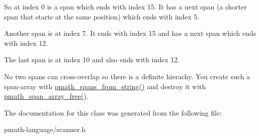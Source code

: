 So at index 0 is a span which ends with index 15. It has a next span (a shorter span that starts at the same position) which ends with index 5. \par
 Another span is at index 7. It ends with index 15 and has a next span which ends with index 12. \par
 The last span is at index 10 and also ends with index 12.

No two spans can cross-overlap so there is a definite hierachy. You create such a span-array with \hyperlink{group__parser_g877ac507e27c8791a265105f796f3cef}{pmath\_\-spans\_\-from\_\-string()} and destroy it with \hyperlink{group__parser_gceb05ef4c39c239d68f39e3b9bde5f1e}{pmath\_\-span\_\-array\_\-free()}. 

The documentation for this class was generated from the following file:\begin{CompactItemize}
\item 
pmath-language/scanner.h\end{CompactItemize}
